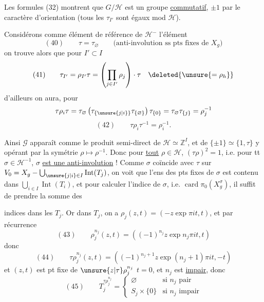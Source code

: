 Les formules (32) montrent que $G/\mathcal H$ est un groupe \uline{commutatif},  $\pm1$ par le caractère d'orientation (tous les $\tau_{I'}$ sont égaux mod $\mathcal H$).

Considérons comme élément de référence de $\mathcal H^{-}$ l'élément
\[
(40)\qquad \tau=\tau_{\varnothing}\qquad
\text{(anti-involution ss pts fixes de $X_g$)}
\]
on trouve alors  que pour $I'\subset I$
\[
(41)\qquad \tau_{I'}=\rho_{I'}\tau=
\left(\prod_{j\in I'}\rho_j\right)\cdot\tau\quad
\deleted{\unsure{=\rho_h}}
\]
d'ailleurs on aura, pour 
\[
\tau\rho_{i}\tau
=\tau_{\varnothing}\left(\tau_{\{\unsure{j|i}\}}\tau_{\{\varnothing\}}\right)
\tau_{\{0\}}
=\tau_{\varnothing}\tau_{\{j\}}=\rho_j^{-1}
\]
\[
(42)\qquad \tau\rho_{i}\tau^{-1}=\rho_{i}^{-1}.
\]

Ainsi $\mathcal G$ apparaît comme le produit semi-direct de $\mathcal H\simeq\mathbb Z^I$, et de
$\{\pm1\}\simeq\{1,\tau\}$ y opérant par la symétrie
$\rho\longmapsto\rho^{-1}$. Donc pour \uline{tout} $\rho\in\mathcal H$,
$(\tau\rho)^2=1$, i.e. pour tt
$\sigma\in\mathcal H^{-1}$,
$\sigma$  \uline{est une anti-involution} !
Comme $\sigma$ coïncide avec $\tau$ sur
$V_0=X_g-\bigcup_{\unsure{j|i}\in I}\operatorname{Int}(T_j)$,
on voit que l'ens des pts fixes de $\sigma$ est contenu dans
$\bigcup_{i\in I}\operatorname{Int}(T_i)$, et pour calculer l'indice de $\sigma$,
i.e. $\operatorname{card}\pi_0(X_g^\sigma)$, il suffit de prendre la somme des

indices dans les $T_j$. Or dans $T_j$, on a 
$\rho_j(z,t)=(-z\exp\pi it,t)$, et par récurrence
\[
(43)\qquad \rho_j^{n_j}(z,t)=\left((-1)^{n_j}z\exp n_j\pi it,t\right)
\]
donc
\[
(44)\qquad \tau\rho_j^{n_j}(z,t)=
\left((-1)^{n_j+1}z\exp(n_j+1)\pi it,-t\right)
\]
et  $(z,t)$ est pt fixe de
$\unsure{z|\tau}\rho_j^{n_j}$ 
$t=0$,  et $n_j$ est \uline{impair}, donc
\[
(45)\qquad T_j^{\tau\rho_j^{n_j}}=
\begin{cases}
\varnothing&\text{si $n_j$ pair}\\
S_j\times\{0\}&\text{si $n_j$ impair}
\end{cases}
\]


